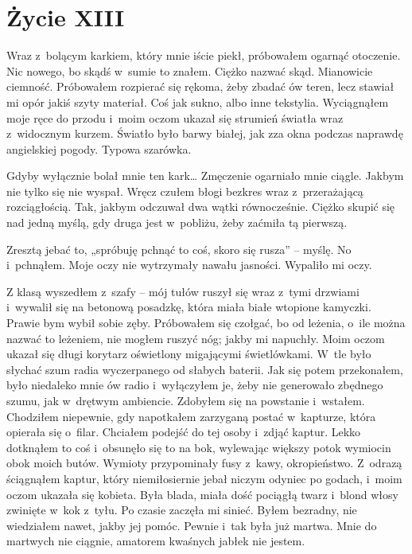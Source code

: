 \chapter{Życie XIII}

Wraz z~bolącym karkiem, który mnie iście piekł, próbowałem ogarnąć otoczenie. Nic nowego, bo skądś w~sumie to znałem. Ciężko nazwać skąd. Mianowicie ciemność. Próbowałem rozpierać się rękoma, żeby zbadać ów teren, lecz stawiał mi opór jakiś szyty materiał. Coś jak sukno, albo inne tekstylia. Wyciągnąłem moje ręce do przodu i~moim oczom ukazał się strumień światła wraz z~widocznym kurzem. Światło było barwy białej, jak zza okna podczas naprawdę angielskiej pogody. Typowa szarówka.

Gdyby wyłącznie bolał mnie ten kark… Zmęczenie ogarniało mnie ciągle. Jakbym nie tylko się nie wyspał. Wręcz czułem błogi bezkres wraz z~przerażającą rozciągłością. Tak, jakbym odczuwał dwa wątki równocześnie. Ciężko skupić się nad jedną myślą, gdy druga jest w~pobliżu, żeby zaćmiła tą pierwszą.

Zresztą jebać to, „spróbuję pchnąć to coś, skoro się rusza” -- myślę. No i~pchnąłem. Moje oczy nie wytrzymały nawału jasności. Wypaliło mi oczy.

\paraSep

Z klasą wyszedłem z~szafy -- mój tułów ruszył się wraz z~tymi drzwiami i~wywalił się na betonową posadzkę, która miała białe wtopione kamyczki. Prawie bym wybił sobie zęby. Próbowałem się czołgać, bo od leżenia, o~ile można nazwać to leżeniem, nie mogłem ruszyć nóg; jakby mi napuchły. Moim oczom ukazał się długi korytarz oświetlony migającymi świetlówkami. W~tle było słychać szum radia wyczerpanego od słabych baterii. Jak się potem przekonałem, było niedaleko mnie ów radio i~wyłączyłem je, żeby nie generowało zbędnego szumu, jak w~drętwym ambiencie. Zdobyłem się na powstanie i~wstałem. Chodziłem niepewnie, gdy napotkałem zarzyganą postać w~kapturze, która opierała się o~filar. Chciałem podejść do tej osoby i~zdjąć kaptur. Lekko dotknąłem to coś i~obsunęło się to na bok, wylewając większy potok wymiocin obok moich butów. Wymioty przypominały fusy z~kawy, okropieństwo. Z~odrazą ściągnąłem kaptur, który niemiłosiernie jebał niczym odyniec po godach, i~moim oczom ukazała się kobieta. Była blada, miała dość pociągłą twarz i~blond włosy zwinięte w~kok z~tyłu. Po czasie zaczęła mi sinieć. Byłem bezradny, nie wiedziałem nawet, jakby jej pomóc. Pewnie i~tak była już martwa. Mnie do martwych nie ciągnie, amatorem kwaśnych jabłek nie jestem.

